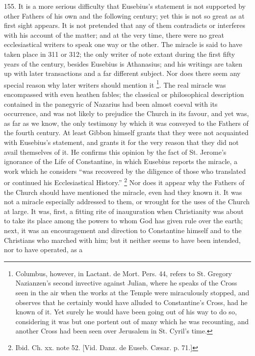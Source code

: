 155.
It is a more serious difficulty that Eusebius's statement is not
supported by other Fathers of his own and the following century; yet
this is not so great as at first sight appears. It is not pretended
that any of them contradicts or interferes with his account of the
matter; and at the very time, there were no great ecclesiastical
writers to speak one way or the other. The miracle is said to have
taken place in 311 or 312; the only writer of note extant during the
first fifty years of the century, besides Eusebius is Athanasius; and
his writings are taken up with later transactions and a far different
subject. Nor does there seem any special reason why later writers
should mention it \footnote{Columbus, however, in Lactant. de Mort. Pers. 44, refers to St.
Gregory Nazianzen's second invective against Julian, where he speaks
of the Cross seen in the air when the works at the Temple were
miraculously stopped, and observes that he certainly would have
alluded to Constantine's Cross, had he known of it. Yet surely he
would have been going out of his way to do so, considering it was but
one portent out of many which he was recounting, and another Cross had
been seen over Jerusalem in St. Cyril's time.}. The
real miracle was encompassed with even heathen fables; the classical
or philosophical description contained in the panegyric of Nazarius had been almost coeval with its occurrence, and was not
likely to prejudice the Church in its favour, and yet was, as far as
we know, the only testimony by which it was conveyed to the Fathers of
the fourth century. At least Gibbon himself grants that they were not
acquainted with Eusebius's statement, and grants it for the very
reason that they did not avail themselves of it. He confirms this
opinion by the fact of St. Jerome's ignorance of the Life of
Constantine, in which Eusebius reports the miracle, a work which he
considers ``was recovered by the diligence of those who translated or
continued his Ecclesiastical History.'' \footnote{Ibid. Ch. xx. note 52. [Vid. Danz. de Euseb. Cæsar. p. 71.]} Nor does it appear why the Fathers of the Church should have
mentioned the miracle, even had they known it. It was not a miracle
especially addressed to them, or wrought for the uses of the Church at
large. It was, first, a fitting rite of inauguration when Christianity
was about to take its place among the powers to whom God has given
rule over the earth; next, it was an encouragement and direction to
Constantine himself and to the Christians who marched with him; but it
neither seems to have been intended, nor to have operated, as a
